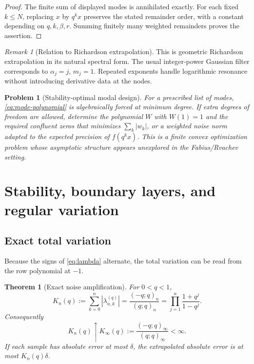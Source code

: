 \documentclass[11pt,oneside]{article}
\numberwithin{equation}{section}
\newtheorem{theorem}{Theorem}[section]
\newtheorem{problem}[problem]{Problem}
\theoremstyle{definition}
\theoremstyle{remark}
\newtheorem{remark}[remark]{Remark}
\begin{document}
\begin{proof}
The finite sum of displayed modes is annihilated exactly.  For each fixed
$k\le N$, replacing $x$ by $q^kx$ preserves the stated remainder order, with a
constant depending on $q,k,\beta,r$.  Summing finitely many weighted remainders
proves the assertion.
\end{proof}

\begin{remark}[Relation to Richardson extrapolation]
This is geometric Richardson extrapolation in its natural spectral form.  The
usual integer-power Gaussian filter corresponds to
$\alpha_j=j$, $m_j=1$.  Repeated exponents handle logarithmic resonance without
introducing derivative data at the nodes.
\end{remark}

\begin{problem}[Stability-optimal modal design]
For a prescribed list of modes, \eqref{eq:mode-polynomial} is algebraically
forced at minimum degree.  If extra degrees of freedom are allowed, determine
the polynomial $W$ with $W(1)=1$ and the required confluent zeros that minimizes
$\sum_k|w_k|$, or a weighted noise norm adapted to the expected precision of
$f(q^kx)$.  This is a finite convex optimization problem whose asymptotic
structure appears unexplored in the Fabius/Rvachev setting.
\end{problem}

\section{Stability, boundary layers, and regular variation}
\label{sec:stability}

\subsection{Exact total variation}

Because the signs of \eqref{eq:lambda} alternate, the total variation can be
read from the row polynomial at $-1$.

\begin{theorem}[Exact noise amplification]
For $0<q<1$,
\begin{equation}
 K_n(q):=\sum_{k=0}^n|\lambda_{n,k}^{(q)}|
 =\frac{(-q;q)_n}{(q;q)_n}
 =\prod_{j=1}^n\frac{1+q^j}{1-q^j}.
 \label{eq:K-n}
\end{equation}
Consequently
\begin{equation}
 K_n(q)\uparrow K_\infty(q):=\frac{(-q;q)_\infty}{(q;q)_\infty}<\infty.
 \label{eq:K-infinity}
\end{equation}
If each sample has absolute error at most $\delta$, the extrapolated absolute
error is at most $K_n(q)\delta$.
\end{theorem}
\end{document}
